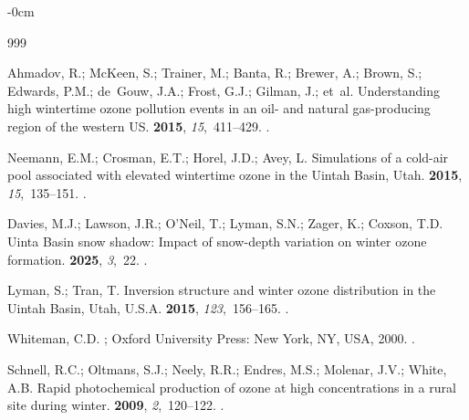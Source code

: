 \documentclass[air,article,accept,moreauthors]{Definitions/mdpi}
\begin{document}
\begin{adjustwidth}{-\extralength}{0cm}
\begin{thebibliography}{999}

Ahmadov, R.; McKeen, S.; Trainer, M.; Banta, R.; Brewer, A.; Brown, S.; Edwards, P.M.; de~Gouw, J.A.; Frost, G.J.; Gilman, J.;  et~al.
\newblock Understanding high wintertime ozone pollution events in an oil- and natural gas-producing region of the western {US}.
 {\bf 2015}, {\em 15},~411--429.
.

Neemann, E.M.; Crosman, E.T.; Horel, J.D.; Avey, L.
\newblock Simulations of a cold-air pool associated with elevated wintertime ozone in the Uintah Basin, Utah.
 {\bf 2015}, {\em 15},~135--151.
.

Davies, M.J.; Lawson, J.R.; O'Neil, T.; Lyman, S.N.; Zager, K.; Coxson, T.D.
\newblock Uinta Basin snow shadow: Impact of snow-depth variation on winter ozone formation.
 {\bf 2025}, {\em 3},~22.
.

Lyman, S.; Tran, T.
\newblock Inversion structure and winter ozone distribution in the Uintah Basin, Utah, {U}.{S}.A.
 {\bf 2015}, {\em 123},~156--165.
.

Whiteman, C.D.
; Oxford University Press: New York, NY, USA,  2000.
.

Schnell, R.C.; Oltmans, S.J.; Neely, R.R.; Endres, M.S.; Molenar, J.V.; White, A.B.
\newblock Rapid photochemical production of ozone at high concentrations in a rural site during winter.
 {\bf 2009}, {\em 2},~120--122.
.


\end{thebibliography}
\end{adjustwidth}
\end{document}
